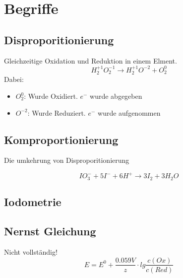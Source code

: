 
\section{Begriffe}

\subsection{Disproporitionierung}

Gleichzeitige Oxidation und Reduktion in einem Elment.
\[
    H_2^{+1}O_2^{-1} \longrightarrow H_2^{+1}O^{-2} + O_2^0
\]
Dabei:
\begin{itemize}
    \item $O_2^0$: Wurde Oxidiert. $e^-$ wurde abgegeben
    \item $O^{-2}$: Wurde Reduziert. $e^-$ wurde aufgenommen
\end{itemize}

\subsection{Komproportionierung}

Die umkehrung von Disproporitionierung

\[
IO_3^- + 5I^- + 6H^+ \longrightarrow 3I_2 + 3H_2O
\]

\subsection{Iodometrie}

\subsection{Nernst Gleichung}
Nicht vollständig!
\[
    E = E^0 + \frac{0.059V}{z} \cdot lg\frac{c(Ox)}{c(Red)}
\]
